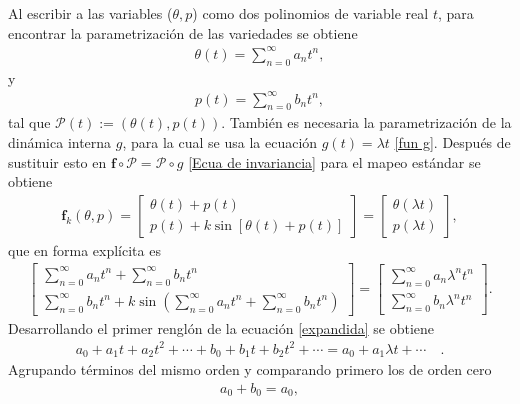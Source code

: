 Al escribir a las variables ($\theta,p$) como dos polinomios de variable real $t$, para encontrar la parametrización de las variedades se obtiene
\begin{eqnarray}
\theta(t)=\sum_{n=0}^{\infty}a_{n}t^{n}  ,
\label{theta}
\end{eqnarray}
y
\begin{eqnarray}
p(t)=\sum_{n=0}^{\infty}b_{n}t^{n},
\label{p}
\end{eqnarray}
tal que $\mathcal{P}(t):=(\theta(t),p(t))$. También es necesaria la parametrización de la dinámica interna $g$, para la cual se usa la ecuación $g(t)=\lambda t$ \eqref{fun g}. Después de sustituir esto en $\mathbf{f}\circ\mathcal{P}=\mathcal{P}\circ g$ \eqref{Ecua de invariancia} para el mapeo estándar se obtiene
\begin{eqnarray}
\mathbf{f}_{k}(\theta,p) = \left[\begin{array}{c}
\theta(t) + p(t) \\
p(t) + k\sin[\theta(t) +p(t)]
\end{array}\right] =\left[ \begin{array}{c}
\theta(\lambda t) \\
p(\lambda t)
\end{array}\right], 
\label{sumas en mapeo}
\end{eqnarray}
que en forma explícita es
\begin{eqnarray}
\left[\begin{array}{c}
\sum_{n=0}^{\infty}a_{n}t^{n} + \sum_{n=0}^{\infty}b_{n}t^{n} \\
\sum_{n=0}^{\infty}b_{n}t^{n} + k\sin(\sum_{n=0}^{\infty}a_{n}t^{n} + \sum_{n=0}^{\infty}b_{n}t^{n})
\end{array}\right] =\left[ \begin{array}{c}
\sum_{n=0}^{\infty}a_{n}\lambda^{n}t^{n} \\
\sum_{n=0}^{\infty}b_{n}\lambda^{n}t^{n}
\end{array}\right].
\label{expandida}
\end{eqnarray}
Desarrollando el primer renglón de la ecuación \eqref{expandida} se obtiene
\begin{eqnarray}
a_{0}+a_{1}t+a_{2}t^{2}+\cdots +b_{0}+b_{1}t+b_{2}t^{2}+ \cdots=a_{0}+a_{1}\lambda t+\cdots\quad .
\label{primer renglon}
\end{eqnarray}
Agrupando términos del mismo orden y comparando primero los de orden cero
\begin{eqnarray}
a_{0}+b_{0}=a_{0},
\end{eqnarray}
